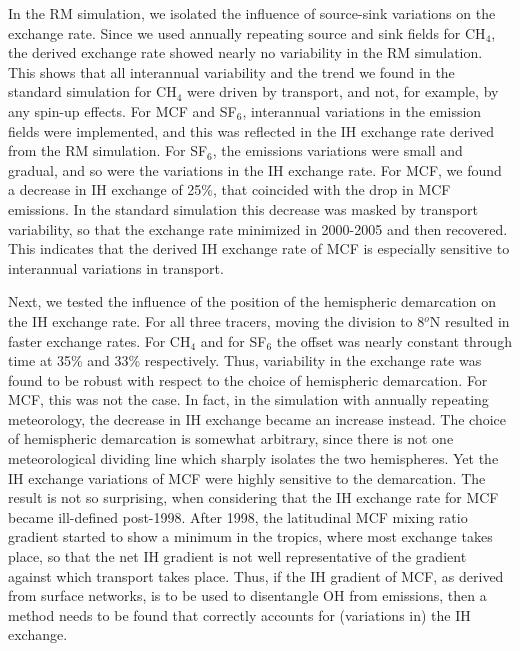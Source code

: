 \documentclass[10pt]{article}
\begin{document}
In the RM simulation, we isolated the influence of source-sink variations on the exchange rate. Since we used annually repeating source and sink fields for CH$_4$, the derived exchange rate showed nearly no variability in the RM simulation. This shows that all interannual variability and the trend we found in the standard simulation for CH$_4$ were driven by transport, and not, for example, by any spin-up effects.
For MCF and SF$_6$, interannual variations in the emission fields were implemented, and this was reflected in the IH exchange rate derived from the RM simulation. For SF$_6$, the emissions variations were small and gradual, and so were the variations in the IH exchange rate. For MCF, we found a decrease in IH exchange of 25\%, that coincided with the drop in MCF emissions. In the standard simulation this decrease was masked by transport variability, so that the exchange rate minimized in 2000-2005 and then recovered. This indicates that the derived IH exchange rate of MCF is especially sensitive to interannual variations in transport.

Next, we tested the influence of the position of the hemispheric demarcation on the IH exchange rate. For all three tracers, moving the division to 8$^{o}$N resulted in faster exchange rates. For CH$_4$ and for SF$_6$ the offset was nearly constant through time at 35\% and 33\% respectively. Thus, variability in the exchange rate was found to be robust with respect to the choice of hemispheric demarcation. For MCF, this was not the case. In fact, in the simulation with annually repeating meteorology, the decrease in IH exchange became an increase instead.
The choice of hemispheric demarcation is somewhat arbitrary, since there is not one meteorological dividing line which sharply isolates the two hemispheres. Yet the IH exchange variations of MCF were highly sensitive to the demarcation. The result is not so surprising, when considering that the IH exchange rate for MCF became ill-defined post-1998. After 1998, the latitudinal MCF mixing ratio gradient started to show a minimum in the tropics, where most exchange takes place, so that the net IH gradient is not well representative of the gradient against which transport takes place. Thus, if the IH gradient of MCF, as derived from surface networks, is to be used to disentangle OH from emissions, then a method needs to be found that correctly accounts for (variations in) the IH exchange.
\end{document}
